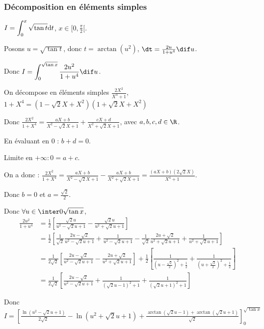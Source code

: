 \subsubsection{Décomposition en éléments simples}
\begin{exemple}
    $\displaystyle I = \int_0^x \sqrt{\tan t} \text d t$, $x \in [0, \frac \pi 2[$.

    Posons $u = \sqrt{\tan t}$, donc $t = \arctan(u^2)$, $\dt = \frac{2u}{1 + u^4} \dif u$.

    Donc $\displaystyle I = \int_0^{\sqrt{\tan x}} \frac{2u^2}{1 + u^4} \dif u$.

    \avspace On décompose en éléments simples $\frac{2X^2}{X^4 + 1}$,
    $1 + X^4 = (1 - \sqrt 2 X + X^2)(1 + \sqrt 2 X + X^2)$

    Donc $\displaystyle \frac{2X^2}{1 + X^4} = \frac{aX + b}{X^2 - \sqrt 2 X + 1} + \frac{cX + d}{X^2 + \sqrt 2 X + 1}$,
    avec $a,b,c,d \in \R$.

    \avspace En évaluant en 0 : $b + d = 0$.

    Limite en $+\infty : 0 = a + c$. 

   \avspace On a donc : $\displaystyle \frac{2X^2}{1 + X^4} = \frac{aX + b}{X^2 - \sqrt 2 X + 1} - \frac{aX + b}{X^2 + \sqrt 2 X + 1} = \frac{(aX + b)(2 \sqrt 2 X)}{X^4 + 1}$.

    Donc $b = 0$ et $a = \frac{\sqrt 2 }{2}$.

    Donc $\forall u \in \inter 0 {\sqrt{\tan x}}$,
    \begin{align*}
        \frac{2 u^2}{1 + u^4} & = \frac 1 2 \left[\frac{\sqrt 2 u }{u^2 - \sqrt 2 u + 1} - \frac{\sqrt 2 u }{u^2 + \sqrt 2 u + 1}\right]\\
        & = \frac 1 2 \left[ \frac 1 {\sqrt 2} \frac{2u - \sqrt 2}{u^2 - \sqrt 2 u + 1} + \frac 1 {u^2 - \sqrt 2 u + 1} - \frac 1 {\sqrt 2} \frac{2u + \sqrt 2}{u^2 + \sqrt 2 u + 1} + \frac 1 {u^2 + \sqrt 2 u + 1} \right]\\
        & = \frac 1 {2 \sqrt 2} \left[ \frac{2u - \sqrt 2}{u^2 - \sqrt 2 u + 1} - \frac{2u + \sqrt 2}{u^2 + \sqrt 2 u + 1} \right] + \frac 1 2 \left[ \frac{1}{\left( u - \frac{\sqrt 2 }{2} \right)^2 + \frac 1 2} + \frac{1}{\left( u + \frac{\sqrt 2}{2} \right)^2 + \frac 1 2} \right]\\
        & = \frac 1 {2 \sqrt 2} \left[ \frac{2u - \sqrt 2}{u^2 - \sqrt 2 u + 1} + \frac 1 {(\sqrt 2 u - 1)^2 + 1} + \frac 1 {(\sqrt 2 u + 1)^2 + 1} \right]
    \end{align*}

    Donc $\displaystyle I = \left[ \frac{\ln(u^2 - \sqrt 2 u + 1)}{2\sqrt 2} - \ln(u^2 + \sqrt 2 u + 1) + \frac{\arctan(\sqrt 2 u - 1) + \arctan(\sqrt 2 u + 1)}{\sqrt 2}\right]_0^{\sqrt{\tan x}}$
\end{exemple}

